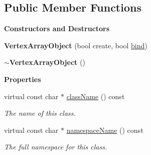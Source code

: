 \subsection*{Public Member Functions}
\begin{Indent}\textbf{ Constructors and Destructors}\par
\begin{DoxyCompactItemize}
\item 
\mbox{\label{classrev_1_1_g_l_1_1_vertex_array_object_aed31de5c93596ad8107b848303b85ae8}} 
{\bfseries Vertex\+Array\+Object} (bool create, bool \mbox{\hyperlink{classrev_1_1_g_l_1_1_vertex_array_object_a080c5dce0981855f5ad0650bedbd2a0c}{bind}})
\item 
\mbox{\label{classrev_1_1_g_l_1_1_vertex_array_object_a14782376b33e7ddbaadc06d9cf14fc09}} 
{\bfseries $\sim$\+Vertex\+Array\+Object} ()
\end{DoxyCompactItemize}
\end{Indent}
\begin{Indent}\textbf{ Properties}\par
\begin{DoxyCompactItemize}
\item 
\mbox{\label{classrev_1_1_g_l_1_1_vertex_array_object_a84ed3eee60de547f6e35118b00f802ff}} 
virtual const char $\ast$ \mbox{\hyperlink{classrev_1_1_g_l_1_1_vertex_array_object_a84ed3eee60de547f6e35118b00f802ff}{class\+Name}} () const
\begin{DoxyCompactList}\small\item\em The name of this class. \end{DoxyCompactList}\item 
\mbox{\label{classrev_1_1_g_l_1_1_vertex_array_object_a98604a2e7bba755dbedf60a4bf1ddfbb}} 
virtual const char $\ast$ \mbox{\hyperlink{classrev_1_1_g_l_1_1_vertex_array_object_a98604a2e7bba755dbedf60a4bf1ddfbb}{namespace\+Name}} () const
\begin{DoxyCompactList}\small\item\em The full namespace for this class. \end{DoxyCompactList}\end{DoxyCompactItemize}
\end{Indent}
